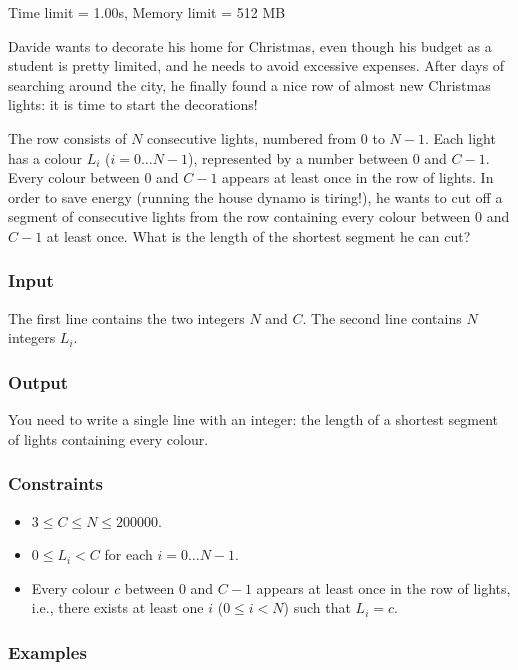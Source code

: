 \noindent Time limit = 1.00s, Memory limit = 512 MB
\bigskip

Davide wants to decorate his home for Christmas, even though his budget as a student is pretty limited,
and he needs to avoid excessive expenses. After days of searching around the city, he finally found a nice
row of almost new Christmas lights: it is time to start the decorations!

\bigskip

The row consists of $N$ consecutive lights, numbered from $0$ to $N-1$. Each light has a colour $L_i$ ($i = 0\dots N-1$), represented by a number between $0$ and $C-1$. Every colour between $0$ and $C-1$ appears at least once in the row of lights. In order to save energy (running the house dynamo is tiring!), he wants to cut off a segment of consecutive lights from the row containing every colour between $0$ and $C-1$ at least once. What is the length of the shortest segment he can cut?

\subsubsection*{Input}
The first line contains the two integers $N$ and $C$. The second line contains $N$ integers $L_i$.


\subsubsection*{Output}
You need to write a single line with an integer: the length of a shortest segment of lights containing every colour.

\subsubsection*{Constraints}

\begin{itemize}
	\item $3 \le C \le N \le 200000$.
	\item $0 \le L_i < C$ for each $i = 0 \dots N-1$.
	\item Every colour $c$ between $0$ and $C-1$ appears at least once in the row of lights, i.e., there exists at least one $i$ ($0 \le i < N$) such that $L_i = c$.
\end{itemize}


\subsubsection*{Examples}
\renewcommand{\arraystretch}{1.5}  

